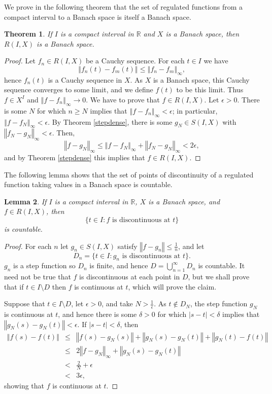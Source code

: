 \documentclass{article}
\newcommand{\norm}[1]{\left\Vert #1 \right\Vert}
\newtheorem{theorem}{Theorem}
\newtheorem{lemma}[theorem]{Lemma}
\theoremstyle{definition}
\begin{document}
We prove  in the following theorem that the set of regulated functions from a compact interval to a Banach space is itself a Banach space.

\begin{theorem}
If $I$ is a compact interval in $\mathbb{R}$ and $X$ is a Banach space, then $R(I,X)$ is a Banach space.
\end{theorem}
\begin{proof}
Let $f_n \in R(I,X)$ be a Cauchy sequence. For each $t \in I$ we have
\[
\norm{f_n(t)-f_m(t)} \leq \norm{f_n-f_m}_\infty,
\] 
hence $f_n(t)$ is a Cauchy sequence in $X$. As $X$ is a Banach space, this Cauchy sequence converges to some limit, and we define
$f(t)$ to be this limit. Thus $f \in X^I$ and $\norm{f-f_n}_\infty \to 0$. We have to prove that $f \in R(I,X)$.
Let $\epsilon>0$. There is some $N$ for which $n \geq N$ implies that $\norm{f-f_n}_\infty < \epsilon$; in particular,
$\norm{f-f_N}_\infty<\epsilon$.
By Theorem \ref{stepdense}, there is some $g_N \in S(I,X)$ with $\norm{f_N-g_N}_\infty<\epsilon$. Then,
\[
\norm{f-g_N}_\infty \leq \norm{f-f_N}_\infty+\norm{f_N-g_N}_\infty < 2\epsilon,
\]
and by Theorem \ref{stepdense} this implies that $f \in R(I,X)$.
\end{proof}


The following lemma shows that the set of points of discontinuity of a regulated function taking values in a Banach space is countable.

\begin{lemma}
If $I$ is a compact interval in $\mathbb{R}$,  $X$ is a Banach space, and  $f \in R(I,X)$, then 
\[
\{t \in I: \textrm{$f$ is discontinuous at $t$}\}
\]
is countable.
\label{countable}
\end{lemma}
\begin{proof}
For each $n$ let $g_n \in S(I,X)$ satisfy $\norm{f-g_n} \leq \frac{1}{n}$, and let
\[
D_n=\{t \in I: \textrm{$g_n$ is discontinuous at $t$}\}.
\]
$g_n$ is a step function so $D_n$ is finite, and hence $D=\bigcup_{n=1}^\infty D_n$ is countable.
It need not be true that
$f$ is discontinuous at each point in $D$, but we shall prove that
if $t \in I \setminus D$ then $f$ is continuous at $t$, which will prove the claim.

Suppose that $t \in I \setminus D$,  let $\epsilon>0$, and take $N>\frac{1}{\epsilon}$. 
As $t \not \in D_N$, the step function $g_N$ is continuous at $t$, and hence there is some
$\delta>0$ for which $|s-t|<\delta$ implies that $\norm{g_N(s)-g_N(t)}<\epsilon$.
If $|s-t| < \delta$, then
\begin{eqnarray*}
\norm{f(s)-f(t)} &\leq& \norm{f(s)-g_N(s)}+\norm{g_N(s)-g_N(t)}+\norm{g_N(t)-f(t)}\\
&\leq&2\norm{f-g_N}_\infty + \norm{g_N(s)-g_N(t)}\\
&<&\frac{2}{N} + \epsilon\\
&<&3\epsilon,
\end{eqnarray*}
showing that $f$ is continuous at $t$. 
\end{proof}
\end{document}
